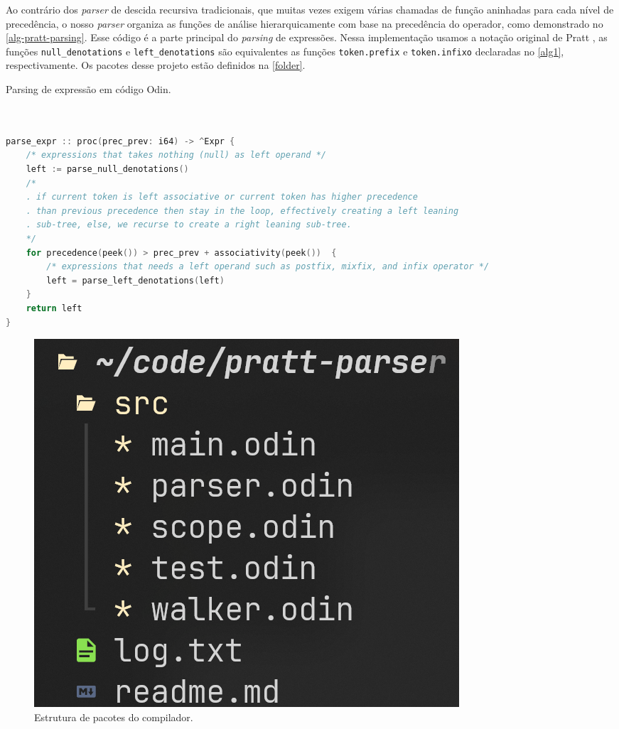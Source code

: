 \documentclass[english, 
               brazil, 
               bsc] %
               {dcomp-abntex2}
\begin{document}
Ao contrário dos \textit{parser} de descida recursiva tradicionais, que muitas vezes exigem várias chamadas de função aninhadas para cada nível de precedência, o nosso \textit{parser} organiza as funções de análise hierarquicamente com base na precedência do operador, como demonstrado no \autoref{alg-pratt-parsing}. Esse código é a parte principal do \textit{parsing} de expressões. Nessa implementação usamos a notação original de Pratt \cite{pratt}, as funções \texttt{null\_denotations} e \texttt{left\_denotations} são equivalentes as funções \texttt{token.prefix} e \texttt{token.infixo} declaradas no \autoref{alg1}, respectivamente. Os pacotes desse projeto estão definidos na \autoref{folder}.




\begin{codigo}[H]
  \caption{\small Parsing de expressão em código Odin.}
        \label{alg-pratt-parsing}
  \begin{lstlisting}[language=C]


parse_expr :: proc(prec_prev: i64) -> ^Expr {
    /* expressions that takes nothing (null) as left operand */
    left := parse_null_denotations() 
    /*
    . if current token is left associative or current token has higher precedence
    . than previous precedence then stay in the loop, effectively creating a left leaning
    . sub-tree, else, we recurse to create a right leaning sub-tree.
    */
    for precedence(peek()) > prec_prev + associativity(peek())  {
        /* expressions that needs a left operand such as postfix, mixfix, and infix operator */
        left = parse_left_denotations(left)
    }
    return left
}


  \end{lstlisting}
\end{codigo}


\begin{figure}[H]
        \caption{\label{folder} \small Estrutura de pacotes do compilador.}
        \begin{center}
            \includegraphics[scale=0.5]{./Imagens/folder_structuer_odin_parser_lexer.png}
        \end{center}
\end{figure}
\end{document}
